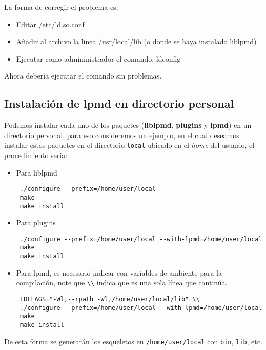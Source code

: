La forma de corregir el problema es,

\begin{itemize}
 \item Editar /etc/ld.so.conf
 \item A\~nadir al archivo la l\'inea /usr/local/lib (o donde se haya instalado liblpmd)
 \item Ejecutar como admininistrador el comando: ldconfig
\end{itemize}

Ahora deber\'ia ejecutar el comando sin problemas.

\subsection{Instalaci\'on de lpmd en directorio personal}
\label{subsub:personaldir}

Podemos instalar cada uno de los paquetes (\textbf{liblpmd}, \textbf{plugins} y \textbf{lpmd}) en un directorio personal, para eso consideremos un ejemplo, en el cual deseamos instalar estos paquetes en el directorio \verb|local| ubicado en el \textit{home} del usuario, el procedimiento ser\'ia:

\begin{itemize}
 \item Para liblpmd
 \begin{verbatim}
 ./configure --prefix=/home/user/local
 make
 make install
 \end{verbatim}
 \item Para plugins
 \begin{verbatim}
 ./configure --prefix=/home/user/local --with-lpmd=/home/user/local
 make
 make install
 \end{verbatim}
 \item Para lpmd, es necesario indicar con variables de ambiente para la compilaci\'on, note que \verb|\\| indica que es una sola l\'inea que contin\'ua.
 \begin{verbatim}
 LDFLAGS="-Wl,--rpath -Wl,/home/user/local/lib" \\
 ./configure --prefix=/home/user/local --with-lpmd=/home/user/local
 make
 make install
 \end{verbatim}
\end{itemize}

De esta forma se generar\'an los esqueletos en \verb|/home/user/local| con \verb|bin|, \verb|lib|, etc.



